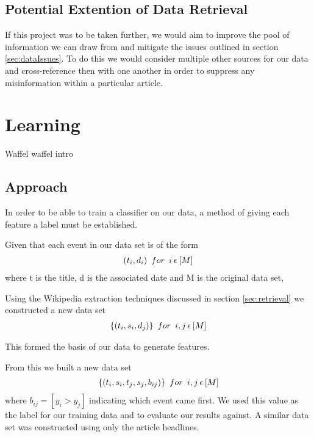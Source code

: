 \documentclass[bsc,frontabs,twoside,singlespacing,parskip,deptreport]{infthesis}     %
\begin{document}
\section{Potential Extention of Data Retrieval}
If this project was to be taken further, we would aim to improve the pool of information we can draw from and mitigate the issues outlined in section \ref{sec:dataIssues}.
To do this we would consider multiple other sources for our data and cross-reference then with one another in order to suppress any misinformation within
a particular article.


\chapter{Learning}
Waffel waffel intro
\section{Approach}
In order to be able to train a classifier on our data, a method of giving each feature a label must be established.

 Given that each event in our data set is of the form
  \begin{eqnarray}
  (t_{i},d_{i}) \hspace{0.5em}for\hspace{0.5em} i \hspace{0.2em}\epsilon \hspace{0.2em} [M]\nonumber
    \end{eqnarray}
    where t is the title, d is the associated date and M is the original data set,

    Using the Wikipedia extraction techniques discussed in section \ref{sec:retrieval} we constructed a new data set
    \begin{eqnarray}
      \{(t_{i},s_{i},d_{j})\} \hspace{0.5em} for \hspace{0.5em}i,j  \hspace{0.2em}\epsilon \hspace{0.2em}[M]\nonumber
    \end{eqnarray}
    
    This formed the basis of our data to generate features.

    From this we built a new data set
    \begin{eqnarray}
      \{(t_{i},s_{i},t_{j},s_{j},b_{ij})\} \hspace{0.5em} for \hspace{0.5em} i,j \hspace{0.2em}\epsilon \hspace{0.2em}[M]\nonumber
      \end{eqnarray}
    where $b_{ij} = [y_{i} > y_{j}]$ indicating which event came first.
    We used this value as the label for our training data and to evaluate our results against.
    A similar data set was constructed using only the article headlines.
    
\end{document}
